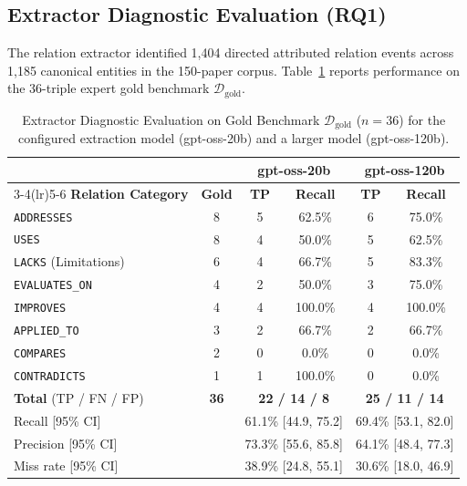 \documentclass[runningheads]{llncs}
\begin{document}
\subsection{Extractor Diagnostic Evaluation (RQ1)}
The relation extractor identified 1,404 directed attributed relation events across 1,185 canonical entities in the 150-paper corpus. Table~\ref{tab:gold} reports performance on the 36-triple expert gold benchmark $\mathcal{D}_{\text{gold}}$.

\begin{table}[htbp]
\centering
\caption{Extractor Diagnostic Evaluation on Gold Benchmark $\mathcal{D}_{\text{gold}}$ ($n = 36$) for the configured extraction model (gpt-oss-20b) and a larger model (gpt-oss-120b).}
\label{tab:gold}
\scriptsize
\setlength{\tabcolsep}{3pt}
\renewcommand{\arraystretch}{0.92}
\begin{tabular}{lccccc}
\toprule
 & & \multicolumn{2}{c}{\textbf{gpt-oss-20b}} & \multicolumn{2}{c}{\textbf{gpt-oss-120b}} \\
\cmidrule(lr){3-4}\cmidrule(lr){5-6}
\textbf{Relation Category} & \textbf{Gold} & \textbf{TP} & \textbf{Recall} & \textbf{TP} & \textbf{Recall} \\
\midrule
\texttt{ADDRESSES} & 8 & 5 & 62.5\% & 6 & 75.0\% \\
\texttt{USES} & 8 & 4 & 50.0\% & 5 & 62.5\% \\
\texttt{LACKS} (Limitations) & 6 & 4 & 66.7\% & 5 & 83.3\% \\
\texttt{EVALUATES\_ON} & 4 & 2 & 50.0\% & 3 & 75.0\% \\
\texttt{IMPROVES} & 4 & 4 & 100.0\% & 4 & 100.0\% \\
\texttt{APPLIED\_TO} & 3 & 2 & 66.7\% & 2 & 66.7\% \\
\texttt{COMPARES} & 2 & 0 & 0.0\% & 0 & 0.0\% \\
\texttt{CONTRADICTS} & 1 & 1 & 100.0\% & 0 & 0.0\% \\
\midrule
\textbf{Total} (TP / FN / FP) & \textbf{36} & \multicolumn{2}{c}{\textbf{22 / 14 / 8}} & \multicolumn{2}{c}{\textbf{25 / 11 / 14}} \\
Recall [95\% CI] & & \multicolumn{2}{c}{61.1\% [44.9, 75.2]} & \multicolumn{2}{c}{69.4\% [53.1, 82.0]} \\
Precision [95\% CI] & & \multicolumn{2}{c}{73.3\% [55.6, 85.8]} & \multicolumn{2}{c}{64.1\% [48.4, 77.3]} \\
Miss rate [95\% CI] & & \multicolumn{2}{c}{38.9\% [24.8, 55.1]} & \multicolumn{2}{c}{30.6\% [18.0, 46.9]} \\
\bottomrule
\end{tabular}
\end{table}
\end{document}
